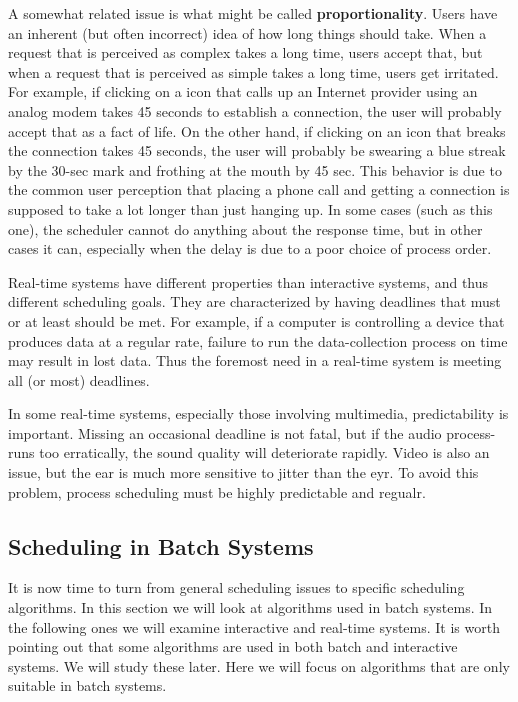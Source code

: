 \documentclass{book}
\newcommand {\kw}  [1] {\textbf{#1}}
\begin{document}
A somewhat related issue is what might be called \kw{proportionality}.
Users have an inherent (but often incorrect) idea of how long things should take.
When a request that is perceived as complex takes a long time, users accept that,
but when a request that is perceived as simple takes a long time, users get irritated.
For example, if clicking on a icon that calls up an Internet provider using an analog modem takes 45 seconds to establish a connection, 
the user will probably accept that as a fact of life.
On the other hand, if clicking on an icon that breaks the connection takes 45 seconds, 
the user will probably be swearing a blue streak by the 30-sec mark and frothing at the mouth by 45 sec.
This behavior is due to the common user perception that 
placing a phone call and getting a connection is supposed to take a lot longer than just hanging up.
In some cases (such as this one), the scheduler cannot do anything about the response time,
but in other cases it can, especially when the delay is due to a poor choice of process order.

Real-time systems have different properties than interactive systems, and thus different scheduling goals.
They are characterized by having deadlines that must or at least should be met.
For example, if a computer is controlling a device that produces data at a regular rate, 
failure to run the data-collection process on time may result in lost data.
Thus the foremost need in a real-time system is meeting all (or most) deadlines.

In some real-time systems, especially those involving multimedia, predictability is important.
Missing an occasional deadline is not fatal, but if the audio process-runs too erratically, the sound quality will deteriorate rapidly.
Video is also an issue, but the ear is much more sensitive to jitter than the eyr.
To avoid this problem, process scheduling must be highly predictable and regualr.

\subsection{Scheduling in Batch Systems}
It is now time to turn from general scheduling issues to specific scheduling algorithms.
In this section we will look at algorithms used in batch systems.
In the following ones we will examine interactive and real-time systems.
It is worth pointing out that some algorithms are used in both batch and interactive systems.
We will study these later.
Here we will focus on algorithms that are only suitable in batch systems.
\end{document}
